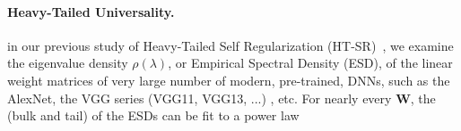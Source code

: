 



\paragraph{Heavy-Tailed Universality.} 

in our previous study of Heavy-Tailed Self Regularization (HT-SR)~\cite{MM18_TR}, we examine the eigenvalue density
$\rho(\lambda)$, or Empirical Spectral  Density (ESD), of the linear weight matrices of very large number of modern, pre-trained, DNNs,
such as the AlexNet, the VGG series (VGG11, VGG13, ...) ,  etc.  For nearly every $\mathbf{W}$, the (bulk and tail) of the ESDs can be fit to a power law

